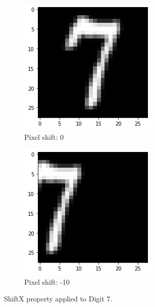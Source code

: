 \begin{figure}[htb!]
\begin{subfigure}[b]{.3\textwidth}
            \includegraphics[width=\textwidth]{images/shiftx2.png}
            \caption{Pixel shift: 0}
            \label{fig:Rotate-misclass0}
        \end{subfigure}%
        \begin{subfigure}[b]{.3\textwidth}
            \centering
            \includegraphics[width=\linewidth]{images/shiftx3.png}
            \caption{Pixel shift: -10}
            \label{fig:Rotate-misclass0}
        \end{subfigure}
        
        \caption{ShiftX property applied to Digit 7.}
        \label{fig:ShiftX-property}
    \end{figure}
    \FloatBarrier
    
